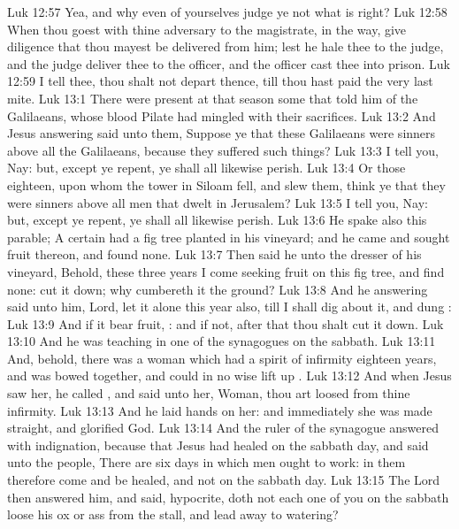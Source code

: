 \vs Luk 12:57 Yea, and why even of yourselves judge ye not what is right?
\vs Luk 12:58 When thou goest with thine adversary to the magistrate,  in the way, give diligence that thou mayest be delivered from him; lest he hale thee to the judge, and the judge deliver thee to the officer, and the officer cast thee into prison.
\vs Luk 12:59 I tell thee, thou shalt not depart thence, till thou hast paid the very last mite.
\vs Luk 13:1 There were present at that season some that told him of the Galilaeans, whose blood Pilate had mingled with their sacrifices.
\vs Luk 13:2 And Jesus answering said unto them, Suppose ye that these Galilaeans were sinners above all the Galilaeans, because they suffered such things?
\vs Luk 13:3 I tell you, Nay: but, except ye repent, ye shall all likewise perish.
\vs Luk 13:4 Or those eighteen, upon whom the tower in Siloam fell, and slew them, think ye that they were sinners above all men that dwelt in Jerusalem?
\vs Luk 13:5 I tell you, Nay: but, except ye repent, ye shall all likewise perish.
\vs Luk 13:6 He spake also this parable; A certain  had a fig tree planted in his vineyard; and he came and sought fruit thereon, and found none.
\vs Luk 13:7 Then said he unto the dresser of his vineyard, Behold, these three years I come seeking fruit on this fig tree, and find none: cut it down; why cumbereth it the ground?
\vs Luk 13:8 And he answering said unto him, Lord, let it alone this year also, till I shall dig about it, and dung :
\vs Luk 13:9 And if it bear fruit, : and if not,  after that thou shalt cut it down.
\vs Luk 13:10 And he was teaching in one of the synagogues on the sabbath.
\vs Luk 13:11 And, behold, there was a woman which had a spirit of infirmity eighteen years, and was bowed together, and could in no wise lift up .
\vs Luk 13:12 And when Jesus saw her, he called , and said unto her, Woman, thou art loosed from thine infirmity.
\vs Luk 13:13 And he laid  hands on her: and immediately she was made straight, and glorified God.
\vs Luk 13:14 And the ruler of the synagogue answered with indignation, because that Jesus had healed on the sabbath day, and said unto the people, There are six days in which men ought to work: in them therefore come and be healed, and not on the sabbath day.
\vs Luk 13:15 The Lord then answered him, and said,  hypocrite, doth not each one of you on the sabbath loose his ox or  ass from the stall, and lead  away to watering?
